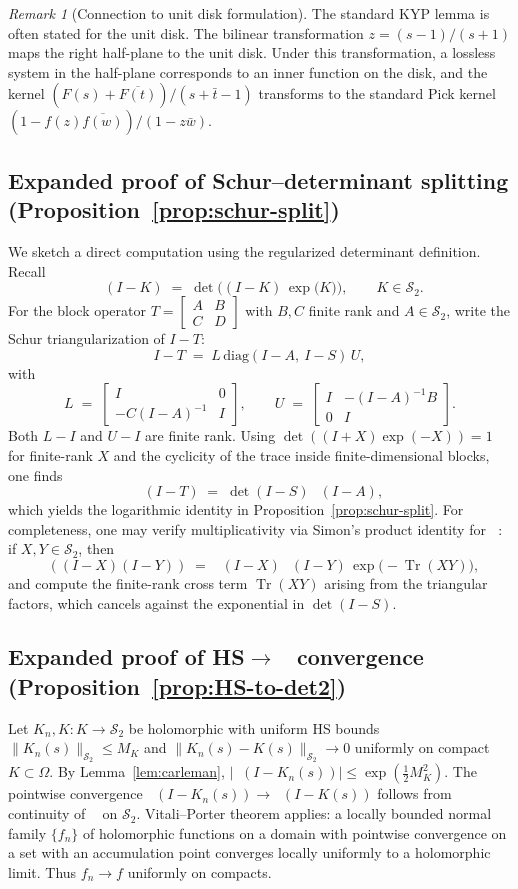 \documentclass[11pt]{article}
\theoremstyle{definition}
\theoremstyle{remark}
\newtheorem{remark}[theorem]{Remark}
\newcommand{\C}{\mathbb{C}}
\newcommand{\HS}{\mathcal{S}_2}
\DeclareMathOperator{\Tr}{Tr}
\DeclareMathOperator{\dettwo}{det_2}
\begin{document}
\begin{remark}[Connection to unit disk formulation]
The standard KYP lemma is often stated for the unit disk. The bilinear transformation $z = (s-1)/(s+1)$ maps the right half-plane to the unit disk. Under this transformation, a lossless system in the half-plane corresponds to an inner function on the disk, and the kernel $(F(s) + \overline{F(t)})/(s + \bar t - 1)$ transforms to the standard Pick kernel $(1 - f(z)\overline{f(w)})/(1 - z\bar w)$.
\end{remark}

\subsection{Expanded proof of Schur--determinant splitting (Proposition~\ref{prop:schur-split})}
We sketch a direct computation using the regularized determinant definition. Recall
\[
 \dettwo(I-K)\;=\;\det\!\Big((I-K)\,\exp\big(K\big)\Big),\qquad K\in\HS.
\]
For the block operator \(T=\begin{bmatrix}A&B\\C&D\end{bmatrix}\) with \(B,C\) finite rank and \(A\in\HS\), write the Schur triangularization of \(I-T\):
\[
 I-T\;=\;L\,\mathrm{diag}(I-A,\ I-S)\,U,
\]
with
\[
 L\;=\;\begin{bmatrix}I & 0\\ -C(I-A)^{-1} & I\end{bmatrix},\qquad U\;=\;\begin{bmatrix}I & -(I-A)^{-1}B\\ 0 & I\end{bmatrix}.
\]
Both \(L-I\) and \(U-I\) are finite rank. Using \(\det((I+X)\exp(-X))=1\) for finite-rank \(X\) and the cyclicity of the trace inside finite-dimensional blocks, one finds
\[
 \dettwo(I-T)\;=\;\det(I-S)\,\dettwo(I-A),
\]
which yields the logarithmic identity in Proposition~\ref{prop:schur-split}. For completeness, one may verify multiplicativity via Simon's product identity for \(\dettwo\): if \(X,Y\in\HS\), then
\[
 \dettwo((I-X)(I-Y))\;=\;\dettwo(I-X)\,\dettwo(I-Y)\,\exp\!\big(-\Tr(XY)\big),
\]
and compute the finite-rank cross term \(\Tr(XY)\) arising from the triangular factors, which cancels against the exponential in \(\det(I-S)\).

\subsection{Expanded proof of HS\(\to\)\(\dettwo\) convergence (Proposition~\ref{prop:HS-to-det2})}
Let \(K_n,K:K\to\HS\) be holomorphic with uniform HS bounds \(\|K_n(s)\|_{\HS}\le M_K\) and \(\|K_n(s)-K(s)\|_{\HS}\to 0\) uniformly on compact \(K\subset\Omega\). By Lemma~\ref{lem:carleman}, \(|\dettwo(I-K_n(s))|\le \exp(\tfrac12 M_K^2)\). The pointwise convergence \(\dettwo(I-K_n(s))\to \dettwo(I-K(s))\) follows from continuity of \(\dettwo\) on \(\HS\). Vitali--Porter theorem applies: a locally bounded normal family \(\{f_n\}\) of holomorphic functions on a domain with pointwise convergence on a set with an accumulation point converges locally uniformly to a holomorphic limit. Thus \(f_n\to f\) uniformly on compacts.
\end{document}
